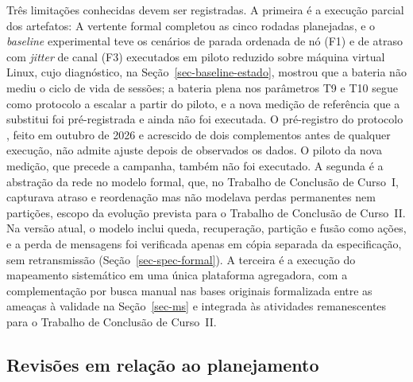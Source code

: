 Três limitações conhecidas devem ser registradas. A primeira é a execução parcial dos artefatos: A vertente formal completou as cinco rodadas planejadas, e o \emph{baseline} experimental teve os cenários de parada ordenada de nó (F1) e de atraso com \emph{jitter} de canal (F3) executados em piloto reduzido sobre máquina virtual Linux, cujo diagnóstico, na Seção~\ref{sec-baseline-estado}, mostrou que a bateria não mediu o ciclo de vida de sessões; a bateria plena nos parâmetros T9 e T10 segue como protocolo a escalar a partir do piloto, e a nova medição de referência que a substitui foi pré-registrada e ainda não foi executada. O pré-registro do protocolo \citep{nosek_preregistration_2018}, feito em outubro de 2026 e acrescido de dois complementos antes de qualquer execução, não admite ajuste depois de observados os dados. O piloto da nova medição, que precede a campanha, também não foi executado. A segunda é a abstração da rede no modelo formal, que, no Trabalho de Conclusão de Curso~I, capturava atraso e reordenação mas não modelava perdas permanentes nem partições, escopo da evolução prevista para o Trabalho de Conclusão de Curso~II. Na versão atual, o modelo inclui queda, recuperação, partição e fusão como ações, e a perda de mensagens foi verificada apenas em cópia separada da especificação, sem retransmissão (Seção~\ref{sec-spec-formal}). A terceira é a execução do mapeamento sistemático em uma única plataforma agregadora, com a complementação por busca manual nas bases originais formalizada entre as ameaças à validade na Seção~\ref{sec-ms} e integrada às atividades remanescentes para o Trabalho de Conclusão de Curso~II.

\subsection*{Revisões em relação ao planejamento}
\label{sec-revisoes}

